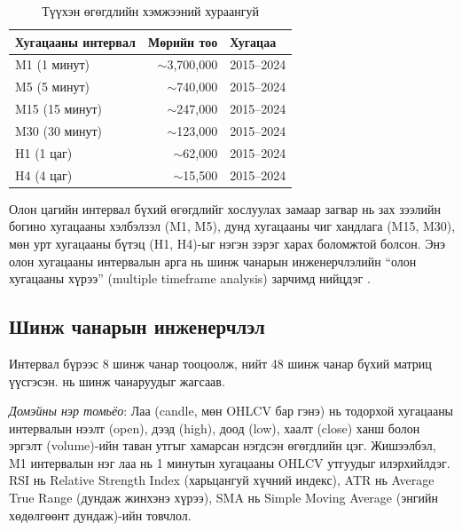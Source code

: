 \begin{table}[H]
\centering
\caption{Түүхэн өгөгдлийн хэмжээний хураангуй}
\label{tab:data_summary}
\begin{tabular}{|l|r|l|}
\hline
\textbf{Хугацааны интервал} & \textbf{Мөрийн тоо} & \textbf{Хугацаа} \\ \hline
M1 (1 минут) & $\sim$3,700,000 & 2015--2024 \\ \hline
M5 (5 минут) & $\sim$740,000 & 2015--2024  \\ \hline
M15 (15 минут) & $\sim$247,000 & 2015--2024  \\ \hline
M30 (30 минут) & $\sim$123,000 & 2015--2024  \\ \hline
H1 (1 цаг) & $\sim$62,000 & 2015--2024  \\ \hline
H4 (4 цаг) & $\sim$15,500 & 2015--2024  \\ \hline
\end{tabular}
\end{table}

Олон цагийн интервал бүхий өгөгдлийг хослуулах замаар загвар нь зах зээлийн богино хугацааны хэлбэлзэл (M1, M5), дунд хугацааны чиг хандлага (M15, M30), мөн урт хугацааны бүтэц (H1, H4)-ыг нэгэн зэрэг харах боломжтой болсон. Энэ олон хугацааны интервалын арга нь шинж чанарын инженерчлэлийн ``олон хугацааны хүрээ'' (multiple timeframe analysis) зарчимд нийцдэг \cite{murphy1999technical}.

\subsection{Шинж чанарын инженерчлэл}
\label{sec:feature_engineering}

Интервал бүрээс 8 шинж чанар тооцоолж, нийт 48 шинж чанар бүхий матриц үүсгэсэн.  нь шинж чанаруудыг жагсаав.

\noindent\textit{Домэйны нэр томьёо}: Лаа (candle, мөн OHLCV бар гэнэ) нь тодорхой хугацааны интервалын нээлт (open), дээд (high), доод (low), хаалт (close) ханш болон эргэлт (volume)-ийн таван утгыг хамарсан нэгдсэн өгөгдлийн цэг. Жишээлбэл, M1 интервалын нэг лаа нь 1 минутын хугацааны OHLCV утгуудыг илэрхийлдэг. RSI нь Relative Strength Index (харьцангуй хүчний индекс), ATR нь Average True Range (дундаж жинхэнэ хүрээ), SMA нь Simple Moving Average (энгийн хөдөлгөөнт дундаж)-ийн товчлол.

